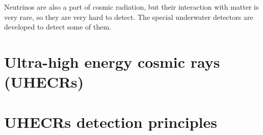\par 
Neutrinos are also a part of cosmic radiation, but their interaction with matter is very rare, so they are very hard to detect. The special underwater detectors are developed to detect some of them. 



\section{Ultra-high energy cosmic rays (UHECRs)}
\section{UHECRs detection principles}


